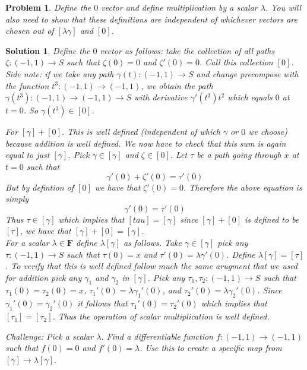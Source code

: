 \documentclass{article}
\theoremstyle{problemstyle}
\newtheorem{problem}{Problem}
\theoremstyle{problemstyle}
\newtheorem{solution}{Solution}
\theoremstyle{problemstyle}
\begin{document}
\begin{problem}
Define the $0$ vector and define multiplication by a scalar $\lambda$. You will also need to show that these definitions are independent of whichever vectors are chosen out of $[\lambda\gamma]$ and $[0]$. 
\end{problem}

\begin{solution}
Define the $0$ vector as follows: take the collection of all paths $\zeta:(-1,1)\rightarrow S$ such that $\zeta(0) = 0$ and $\zeta'(0) = 0$. Call this collection $[0]$.  Side note: if we take any path $\gamma(t):(-1,1)\rightarrow S$ and change precompose with the function $t^3:(-1,1) \rightarrow (-1,1)$, we obtain the path $\gamma(t^3): (-1,1) \rightarrow (-1,1) \rightarrow S$ with derivative $\gamma'(t^3)t^2$ which equals $0$ at $t = 0$. So $\gamma(t^3) \in [0]$. 

For $[\gamma] + [0]$. This is well defined (independent of which $\gamma$ or $0$ we choose) because addition is well defined. We now have to check that this sum is again equal to just $[\gamma]$. Pick $\gamma \in [\gamma]$ and $\zeta \in [0]$. Let $\tau$ be a path going through $x$ at $t=0$ such that $$\gamma'(0)+\zeta'(0) = \tau'(0)$$ But by defintion of $[0]$ we have that $\zeta'(0) = 0$. Therefore the above equation is simply $$\gamma'(0) = \tau'(0)$$ Thus $\tau \in [\gamma]$ which implies that $[tau] = [\gamma]$ since $[\gamma] + [0]$ is defined to be $[\tau]$, we have that $[\gamma] + [0] = [\gamma]$.\\ 

For a scalar $\lambda \in \textbf{F}$ define $\lambda[\gamma]$ as follows. Take $\gamma \in [\gamma]$ pick any $\tau:(-1,1)\rightarrow S$ such that $\tau(0)=x$ and $\tau'(0)=\lambda\gamma'(0)$. Define $\lambda[\gamma] = [\tau]$. To verify that this is well defined follow much the same arugment that we used for addition pick any $\gamma_1$ and $\gamma_2$ in $[\gamma]$. Pick any $\tau_1, \tau_2:(-1,1)\rightarrow S$ such that $\tau_1(0) = \tau_2(0)=x$, $\tau_1'(0)=\lambda\gamma_1'(0)$, and $\tau_2'(0)=\lambda\gamma_2'(0)$. Since $\gamma_1'(0) = \gamma_2'(0)$ it follows that $\tau_1'(0) = \tau_2'(0)$ which implies that $[\tau_1] = [\tau_2]$. Thus the operation of scalar multiplication is well defined. 

Challenge: Pick a scalar $\lambda$. Find a differentiable function $f:(-1,1) \rightarrow (-1,1)$ such that $f(0) = 0$ and $f'(0) = \lambda$. Use this to create a specific map from $[\gamma] \rightarrow \lambda[\gamma]$.  
\end{solution}
\end{document}
